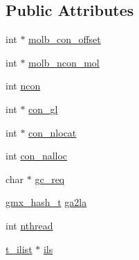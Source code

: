 \subsection*{\-Public \-Attributes}
\begin{DoxyCompactItemize}
\item 
int $\ast$ \hyperlink{structgmx__domdec__constraints_a9b925277669a0425c5f535b880a467a4}{molb\-\_\-con\-\_\-offset}
\item 
int $\ast$ \hyperlink{structgmx__domdec__constraints_a977db71f4cfa879f92474aef0db59334}{molb\-\_\-ncon\-\_\-mol}
\item 
int \hyperlink{structgmx__domdec__constraints_aaed984e12054cba5d3c9115c0397701e}{ncon}
\item 
int $\ast$ \hyperlink{structgmx__domdec__constraints_a2c0f832a218307bc6f892543e0803a9f}{con\-\_\-gl}
\item 
int $\ast$ \hyperlink{structgmx__domdec__constraints_a4429100ab709a38767f2b06c7a3c77fd}{con\-\_\-nlocat}
\item 
int \hyperlink{structgmx__domdec__constraints_a209998e29835704690756996b5d5d1ef}{con\-\_\-nalloc}
\item 
char $\ast$ \hyperlink{structgmx__domdec__constraints_a319961305025810acba5ea6b22a0225b}{gc\-\_\-req}
\item 
\hyperlink{include_2types_2commrec_8h_a560df2747fed5736f0666039be2e9e49}{gmx\-\_\-hash\-\_\-t} \hyperlink{structgmx__domdec__constraints_a0bd59fde49a22ca123f19e0b04fd5677}{ga2la}
\item 
int \hyperlink{structgmx__domdec__constraints_ab36a932b3b692f26c3d96cf2af40a71d}{nthread}
\item 
\hyperlink{structt__ilist}{t\-\_\-ilist} $\ast$ \hyperlink{structgmx__domdec__constraints_a22e69d615ac61bc1987f4e9bf29d8daf}{ils}
\end{DoxyCompactItemize}



